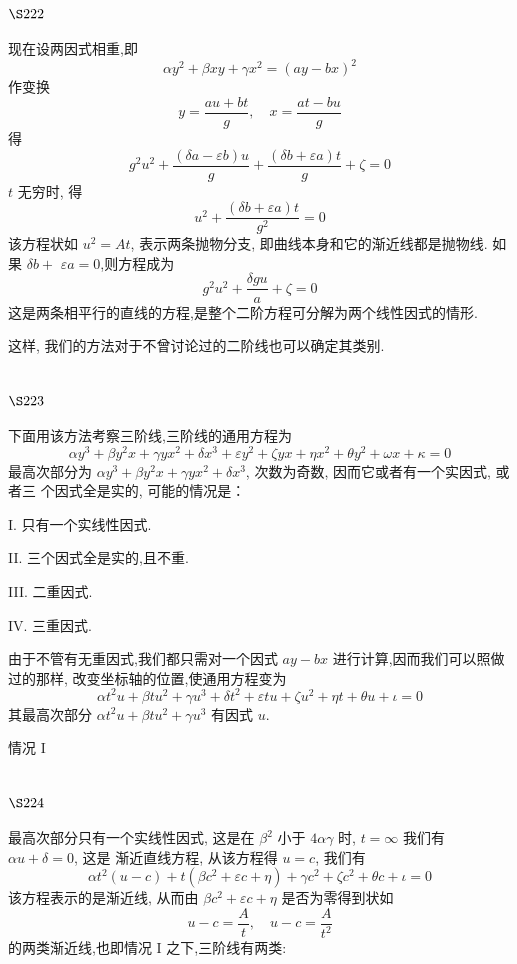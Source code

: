 \section{$\S 222$}

现在设两因式相重,即
\[
\alpha y^{2}+\beta x y+\gamma x^{2}=(a y-b x)^{2}
\]
作变换
\[
y=\frac{a u+b t}{g}, \quad x=\frac{a t-b u}{g}
\]
得
\[
g^{2} u^{2}+\frac{(\delta a-\varepsilon b) u}{g}+\frac{(\delta b+\varepsilon a) t}{g}+\zeta=0
\]
$t$ 无穷时, 得
\[
u^{2}+\frac{(\delta b+\varepsilon a) t}{g^{2}}=0
\]
该方程状如 $u^{2}=A t$, 表示两条抛物分支, 即曲线本身和它的渐近线都是抛物线. 如果 $\delta b+$ $\varepsilon a=0$,则方程成为
\[
g^{2} u^{2}+\frac{\delta g u}{a}+\zeta=0
\]
这是两条相平行的直线的方程,是整个二阶方程可分解为两个线性因式的情形.

这样, 我们的方法对于不曾讨论过的二阶线也可以确定其类别. 

\section{$\S 223$}

下面用该方法考察三阶线,三阶线的通用方程为
\[
\alpha y^{3}+\beta y^{2} x+\gamma y x^{2}+\delta x^{3}+\varepsilon y^{2}+\zeta y x+\eta x^{2}+\theta y^{2}+\omega x+\kappa=0
\]
最高次部分为 $\alpha y^{3}+\beta y^{2} x+\gamma y x^{2}+\delta x^{3}$, 次数为奇数, 因而它或者有一个实因式, 或者三 个因式全是实的, 可能的情况是：

$\mathrm{I}$. 只有一个实线性因式.

II. 三个因式全是实的,且不重.

III. 二重因式.

IV. 三重因式.

由于不管有无重因式,我们都只需对一个因式 $a y-b x$ 进行计算,因而我们可以照做 过的那样, 改变坐标轴的位置,使通用方程变为
\[
\alpha t^{2} u+\beta t u^{2}+\gamma u^{3}+\delta t^{2}+\varepsilon t u+\zeta u^{2}+\eta t+\theta u+\iota=0
\]
其最高次部分 $\alpha t^{2} u+\beta t u^{2}+\gamma u^{3}$ 有因式 $u$.

情况 I

\section{$\S 224$}

最高次部分只有一个实线性因式, 这是在 $\beta^{2}$ 小于 $4 \alpha \gamma$ 时, $t=\infty$ 我们有 $\alpha u+\delta=0$, 这是 渐近直线方程, 从该方程得 $u=c$, 我们有
\[
\alpha t^{2}(u-c)+t\left(\beta c^{2}+\varepsilon c+\eta\right)+\gamma c^{2}+\zeta c^{2}+\theta c+\iota=0
\]
该方程表示的是渐近线, 从而由 $\beta c^{2}+\varepsilon c+\eta$ 是否为零得到状如
\[
u-c=\frac{A}{t}, \quad u-c=\frac{A}{t^{2}}
\]
的两类渐近线,也即情况 I 之下,三阶线有两类:

